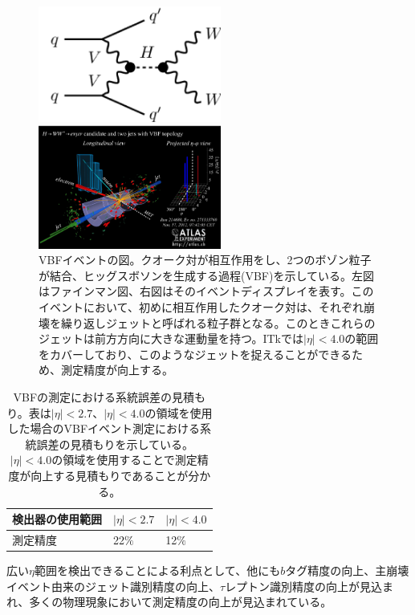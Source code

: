 \begin{figure}[bpt]
  \begin{minipage}{0.5\hsize}
    \begin{center}
    \includegraphics[width=60mm]{VBF_fainman}
    \end{center}
  \end{minipage}
  \begin{minipage}{0.5\hsize}
    \begin{center}
    \includegraphics[width=60mm]{VBF_event_display}
    \end{center}
  \end{minipage}
  \caption[VBFイベントの図]{VBFイベントの図。クオーク対が相互作用をし、2つのボゾン粒子が結合、ヒッグスボソンを生成する過程(VBF)を示している。左図はファインマン図、右図はそのイベントディスプレイを表す。このイベントにおいて、初めに相互作用したクオーク対は、それぞれ崩壊を繰り返しジェットと呼ばれる粒子群となる。このときこれらのジェットは前方方向に大きな運動量を持つ。ITkでは$|\eta|<4.0$の範囲をカバーしており、このようなジェットを捉えることができるため、測定精度が向上する。}
  \label{VBF_image}
\end{figure}

\begin{table}[tbp]
\begin{center}
\caption[VBFの測定における系統誤差の見積もり]{VBFの測定における系統誤差の見積もり。表は$|\eta| <2.7$、$|\eta| <4.0$の領域を使用した場合のVBFイベント測定における系統誤差の見積もりを示している。$|\eta| <4.0$の領域を使用することで測定精度が向上する見積もりであることが分かる。}
\label{VBF_uncertainty}
  \begin{tabular}{|lll|} \hline
    検出器の使用範囲 & $|\eta| <2.7 $ & $|\eta| < 4.0 $ \\ \hline
    測定精度 & 22$\%$ & 12$\%$ \\ \hline
  \end{tabular}
\end{center}
\end{table}

広い$\eta$範囲を検出できることによる利点として、他にも$b$タグ精度の向上、主崩壊イベント由来のジェット識別精度の向上、$\tau$レプトン識別精度の向上が見込まれ、多くの物理現象において測定精度の向上が見込まれている。

